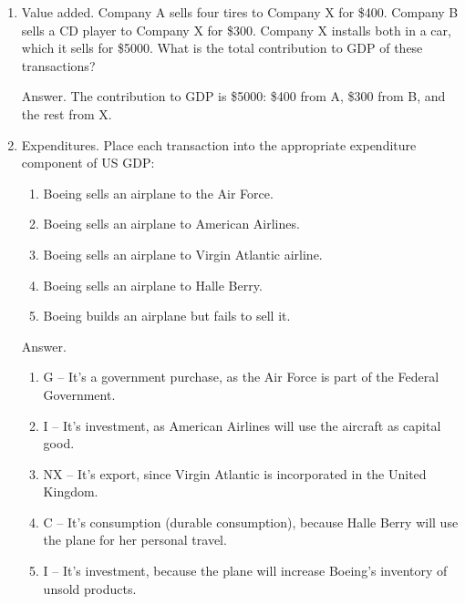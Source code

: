 \setlength{\leftmargini}{.5\oldleftmargini}
\begin{enumerate}

\item Value added.  Company A sells four tires to Company X for \$400.
Company B sells a CD player to Company X for \$300.
Company X installs both in a car, which it sells for \$5000.
What is the total contribution to GDP of these transactions?

Answer.  The contribution to GDP is \$5000: \$400 from A, \$300 from B,
and the rest from X.

\item Expenditures.
Place each transaction into the appropriate expenditure component of US GDP:%
%
\begin{enumerate}
\item Boeing sells an airplane to the Air Force.%
\item Boeing sells an airplane to American Airlines.%
\item Boeing sells an airplane to Virgin Atlantic airline.%
\item Boeing sells an airplane to Halle Berry.%
\item Boeing builds an airplane but fails to sell it.%
\end{enumerate}

Answer.
%
\begin{enumerate}
\item G -- It's a government purchase, as the Air Force is part of the Federal Government.%
\item I -- It's investment, as American Airlines will use the aircraft as capital good.%
\item NX -- It's export, since Virgin Atlantic is incorporated in the United Kingdom.%
\item C -- It's consumption (durable consumption), because Halle Berry will use the plane for her personal travel.%
\item I -- It's investment, because the plane will increase Boeing's inventory of unsold products.%
\end{enumerate}



\end{enumerate}
